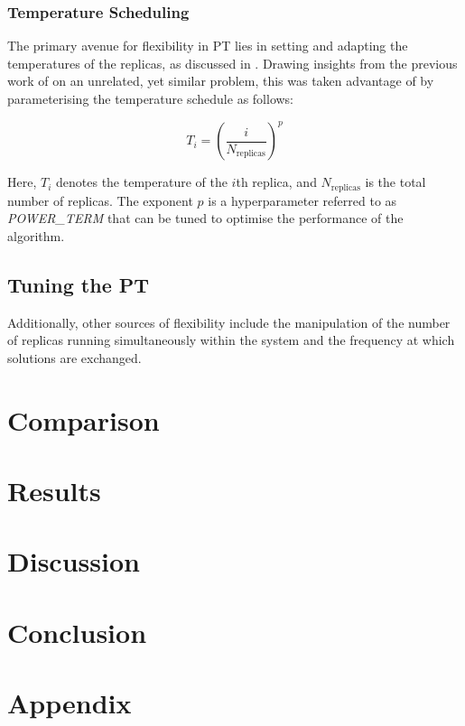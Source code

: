 \documentclass[10pt]{article}
\begin{document}
\begin{multicols}{2}
\subsubsection{Temperature Scheduling}

The primary avenue for flexibility in PT lies in setting and adapting the temperatures of the replicas, as discussed in \cite{Earl_2005}. Drawing insights from the previous work of \cite{CALDERHEAD20094028} on an unrelated, yet similar problem, this was taken advantage of by parameterising the temperature schedule as follows:

\begin{equation}
    T_i = \left(\frac{i}{{N_{\text{replicas}}}}\right)^p
    \label{eq:PTtemp}
\end{equation}

Here, $T_i$ denotes the temperature of the $i$th replica, and $N_{\text{replicas}}$ is the total number of replicas. The exponent $p$ is a hyperparameter referred to as \textit{POWER\_TERM} that can be tuned to optimise the performance of the algorithm.

\subsection{Tuning the PT}
\label{sec:PTtuning}

Additionally, other sources of flexibility include the manipulation of the number of replicas running simultaneously within the system and the frequency at which solutions are exchanged.
\end{multicols}

\section{Comparison}
\label{sec:CGA_QEG_comparison}
\section{Results}
\section{Discussion}
\section{Conclusion}

\newpage
\section{Appendix}
\end{document}
